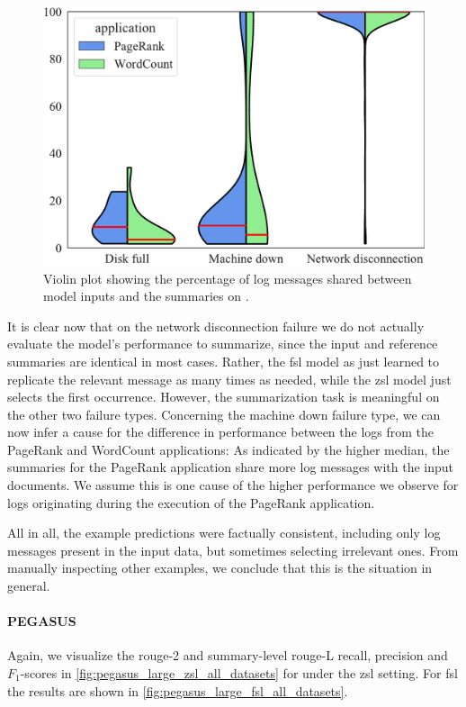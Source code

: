 \begin{figure}[htbp]
\centering
\includegraphics[width=.75\textwidth]{images/thesis/hadoop_curated_summary_document_overlap}
\caption{Violin plot showing the percentage of log messages shared between model inputs and the summaries on \hadoop{}.}
\label{fig:hadoop_summary_document_overlap}
\end{figure}

It is clear now that on the network disconnection failure we do not actually evaluate the model's performance to summarize,
since the input and reference summaries are identical in most cases.
Rather, the \ac{fsl} model as just learned to replicate the relevant message as many times as needed,
while the \ac{zsl} model just selects the first occurrence.
However, the summarization task is meaningful on the other two failure types.
Concerning the machine down failure type, we can now infer a cause for the difference in performance between the logs from the PageRank and WordCount applications:
As indicated by the higher median, the summaries for the PageRank application share more log messages with the input documents.
We assume this is one cause of the higher performance we observe for logs originating during the execution of the PageRank application.

All in all, the example predictions were factually consistent,
including only log messages present in the input data,
but sometimes selecting irrelevant ones.
From manually inspecting other examples,
we conclude that this is the situation in general.

\paragraph{PEGASUS}

Again, we visualize the \acs*{rouge}-2 and summary-level \acs*{rouge}-L recall, precision and \(F_1\)-scores
in \autoref{fig:pegasus_large_zsl_all_datasets} for  under the \ac{zsl} setting.
For \ac{fsl} the results are shown in \autoref{fig:pegasus_large_fsl_all_datasets}.

